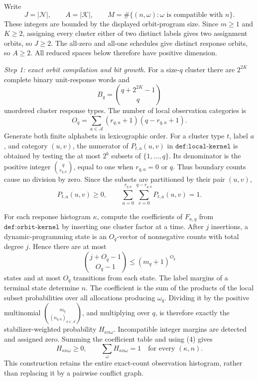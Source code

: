 Write
\[
 J=|\mathcal N|,
 \qquad A=|\mathcal K|,
 \qquad
 M=\#\{(n,\omega):\omega\text{ is compatible with }n\}.
\tag{1}
\]
These integers are bounded by the displayed orbit-program size.  Since \(m\ge1\) and \(K\ge2\), assigning every cluster either of two distinct labels gives two assignment orbits, so \(J\ge2\).  The all-zero and all-one schedules give distinct response orbits, so \(A\ge2\).  All reduced spaces below therefore have positive dimension.

\emph{Step 1: exact orbit compilation and bit growth.}
For a size-\(q\) cluster there are \(2^{2K}\) complete binary unit-response words and
\[
 B_q=\binom{q+2^{2K}-1}{q}
\tag{2}
\]
unordered cluster response types.  The number of local observation categories is
\[
 O_q=\sum_{a\in\mathcal A}(r_{q,a}+1)(q-r_{q,a}+1).
\tag{3}
\]
Generate both finite alphabets in lexicographic order.  For a cluster type \(t\), label \(a\), and category \((u,v)\), the numerator of \(P_{t,a}(u,v)\) in \(\texttt{def:local-kernel}\) is obtained by testing the at most \(2^b\) subsets of \(\{1,\ldots,q\}\).  Its denominator is the positive integer \(\binom q{r_{q,a}}\), equal to one when \(r_{q,a}=0\) or \(q\).  Thus boundary counts cause no division by zero.  Since the subsets are partitioned by their pair \((u,v)\),
\[
 P_{t,a}(u,v)\ge0,
 \qquad
 \sum_{u=0}^{r_{q,a}}\sum_{v=0}^{q-r_{q,a}}P_{t,a}(u,v)=1.
\tag{4}
\]

For each response histogram \(\kappa\), compute the coefficients of \(F_{\kappa,q}\) from \(\texttt{def:orbit-kernel}\) by inserting one cluster factor at a time.  After \(j\) insertions, a dynamic-programming state is an \(O_q\)-vector of nonnegative counts with total degree \(j\).  Hence there are at most
\[
 \binom{j+O_q-1}{O_q-1}\le (m_q+1)^{O_q}
\tag{5}
\]
states and at most \(O_q\) transitions from each state.  The label margins of a terminal state determine \(n\).  The coefficient is the sum of the products of the local subset probabilities over all allocations producing \(\omega_q\).  Dividing it by the positive multinomial \(\binom{m_q}{(n_{q,a})_{a\in\mathcal A}}\), and multiplying over \(q\), is therefore exactly the stabilizer-weighted probability \(H_{\kappa n\omega}\).  Incompatible integer margins are detected and assigned zero.  Summing the coefficient table and using (4) gives
\[
 H_{\kappa n\omega}\ge0,
 \qquad
 \sum_{\omega}H_{\kappa n\omega}=1
 \quad\text{for every }(\kappa,n).
\tag{6}
\]
This construction retains the entire exact-count observation histogram, rather than replacing it by a pairwise conflict graph.

